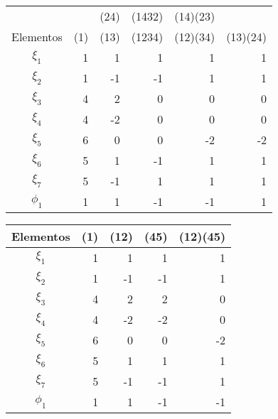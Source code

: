 \documentclass[12pt]{book}
\theoremstyle{definition}
\newcounter{in}
\begin{document}
{\begin{tabular}{c |r r r r r}
   & & (24) & (1432) & (14)(23) & \\
  Elementos & (1) & (13) & (1234) & (12)(34) & (13)(24) \\
    \hline
  $\xi_{1}$ & 1 & 1 & 1 & 1 & 1 \\
  $\xi_{2}$ & 1 & -1 & -1 & 1 & 1 \\
  $\xi_{3}$ & 4 & 2 & 0 & 0 & 0 \\
  $\xi_{4}$ & 4 & -2 & 0 & 0 & 0 \\
  $\xi_{5}$ & 6 & 0 & 0 & -2 & -2 \\
  $\xi_{6}$ & 5 & 1 & -1 & 1 & 1 \\
  $\xi_{7}$ & 5 & -1 & 1 & 1 & 1 \\
  \hline
  $\phi_{1}$ & 1 & 1 & -1 & -1 & 1 \\
\end{tabular}

\bigskip

\begin{tabular}{c |r r r r}
  Elementos & (1) & (12) & (45) & (12)(45) \\
    \hline
  $\xi_{1}$ & 1 & 1  & 1  & 1 \\
  $\xi_{2}$ & 1 & -1 & -1 & 1  \\
  $\xi_{3}$ & 4 & 2  & 2  & 0  \\
  $\xi_{4}$ & 4 & -2 & -2 & 0  \\
  $\xi_{5}$ & 6 & 0  & 0  & -2 \\
  $\xi_{6}$ & 5 & 1  & 1  & 1  \\
  $\xi_{7}$ & 5 & -1 & -1 & 1  \\
  \hline
  $\phi_{1}$ & 1 & 1 & -1 & -1 \\
\end{tabular}

\bigskip

}
\end{document}
